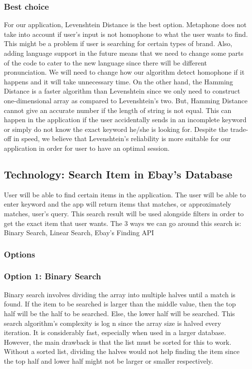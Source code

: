\documentclass[journal,compsoc, 10pt, draftclsnofoot, onecolumn]{IEEEtran}
\begin{document}
\subsubsection{Best choice}
For our application, Levenshtein Distance is the best option. Metaphone does not take into account if user's input is not homophone to what the user wants to find. This might be a problem if user is searching for certain types of brand. Also, adding language support in the future means that we need to change some parts of the code to cater to the new language since there will be different pronunciation. We will need to change how our algorithm detect homophone if it happens and it will take unnecessary time. On the other hand, the Hamming Distance is a faster algorithm than Levenshtein since we only need to construct one-dimensional array as compared to Levenshtein's two. But, Hamming Distance cannot give an accurate number if the length of string is not equal. This can happen in the application if the user accidentally sends in an incomplete keyword or simply do not know the exact keyword he/she is looking for. Despite the trade-off in speed, we believe that Levenshtein's reliability is more suitable for our application in order for user to have an optimal session.

\subsection{Technology: Search Item in Ebay's Database}
User will be able to find certain items in the application. The user will be able to enter keyword and the app will return items that matches, or approximately matches, user's query. This search result will be used alongside filters in order to get the exact item that user wants. 
The 3 ways we can go around this search is: Binary Search, Linear Search, Ebay's Finding API

\subsubsection{Options}
\subsubsection*{Option 1: Binary Search}
Binary search involves dividing the array into multiple halves until a match is found. If the item to be searched is larger than the middle value, then the top half will be the half to be searched. Else, the lower half will be searched. This search algorithm's complexity is log n since the array size is halved every iteration. It is considerably fast, especially when used in a larger database. However, the main drawback is that the list must be sorted for this to work. Without a sorted list, dividing the halves would not help finding the item since the top half and lower half might not be larger or smaller respectively. 
\end{document}
